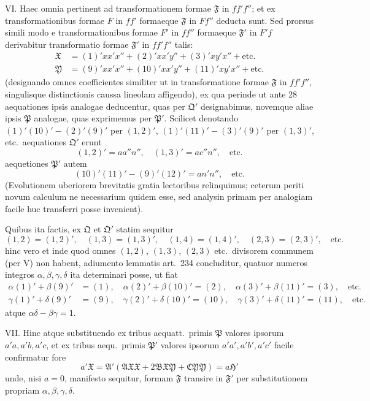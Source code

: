 \documentclass[12pt,a4paper]{article}
\theoremstyle{plain}
\theoremstyle{definition}
\theoremstyle{remark}
\theoremstyle{problemstyle}
\begin{document}
VI. Haec omnia pertinent ad transformationem formae $\mathfrak{F}$ in $ff'f''$; et ex transformationibus formae $F$ in $ff'$ formaeque $\mathfrak{F}$ in $Ff''$ deducta sunt. Sed prorsus simili modo e transformationibus formae $F'$ in $ff''$ formaeque $\mathfrak{F}'$ in $F'f$ derivabitur transformatio formae $\mathfrak{F}'$ in $ff'f''$ talis:
\begin{align*}
\mathfrak{X} &= (1)'xx'x'' + (2)'xx'y'' + (3)'xy'x'' + \text{etc.} \\
\mathfrak{Y} &= (9)'xx'x'' + (10)'xx'y'' + (11)'xy'x'' + \text{etc.}
\end{align*}
(designando omnes coefficientes similiter ut in transformatione formae $\mathfrak{F}$ in $ff'f''$, singulisque distinctionis caussa lineolam affigendo), ex qua perinde ut ante 28 aequationes ipsis analogae deducentur, quas per $\mathfrak{Q}'$ designabimus, novemque aliae ipsis $\mathfrak{P}$ analogae, quas exprimemus per $\mathfrak{P}'$. Scilicet denotando $(1)'(10)' - (2)'(9)'$ per $(1,2)'$, $(1)'(11)' - (3)'(9)'$ per $(1,3)'$, etc.\ aequationes $\mathfrak{Q}'$ erunt
\[
(1,2)' = aa''n'', \quad (1,3)' = ac''n'', \quad \text{etc.}
\]
aequetiones $\mathfrak{P}'$ autem
\[
(10)'(11)' - (9)'(12)' = an'n'', \quad \text{etc.}
\]
(Evolutionem uberiorem brevitatis gratia lectoribus relinquimus; ceterum periti novum calculum ne necessarium quidem esse, sed analysin primam per analogiam facile huc transferri posse invenient).

Quibus ita factis, ex $\mathfrak{Q}$ et $\mathfrak{Q}'$ statim sequitur
\[
(1,2) = (1,2)', \quad (1,3) = (1,3)', \quad (1,4) = (1,4)', \quad (2,3) = (2,3)', \quad \text{etc.}
\]
hinc vero et inde quod omnes $(1,2)$, $(1,3)$, $(2,3)$ etc.\ divisorem communem (per V) non habent, adiumento lemmatis art.\ 234 concluditur, quatuor numeros integros $\alpha, \beta, \gamma, \delta$ ita determinari posse, ut fiat
\begin{align*}
\alpha(1)' + \beta(9)' &= (1), \quad \alpha(2)' + \beta(10)' = (2), \quad \alpha(3)' + \beta(11)' = (3), \quad \text{etc.} \\
\gamma(1)' + \delta(9)' &= (9), \quad \gamma(2)' + \delta(10)' = (10), \quad \gamma(3)' + \delta(11)' = (11), \quad \text{etc.}
\end{align*}
atque $\alpha\delta - \beta\gamma = 1$.

VII. Hinc atque substituendo ex tribus aequatt.\ primis $\mathfrak{P}$ valores ipsorum $a'a, a'b, a'c$, et ex tribus aequ.\ primis $\mathfrak{P}'$ valores ipsorum $a'a', a'b', a'c'$ facile confirmatur fore
\[
a'\mathfrak{X} = \mathfrak{A}'(\mathfrak{A}\mathfrak{X}\mathfrak{X} + 2\mathfrak{B}\mathfrak{X}\mathfrak{Y} + \mathfrak{C}\mathfrak{Y}\mathfrak{Y}) = a\mathfrak{H}'
\]
unde, nisi $a = 0$, manifesto sequitur, formam $\mathfrak{F}$ transire in $\mathfrak{F}'$ per substitutionem propriam $\alpha, \beta, \gamma, \delta$.
\end{document}
